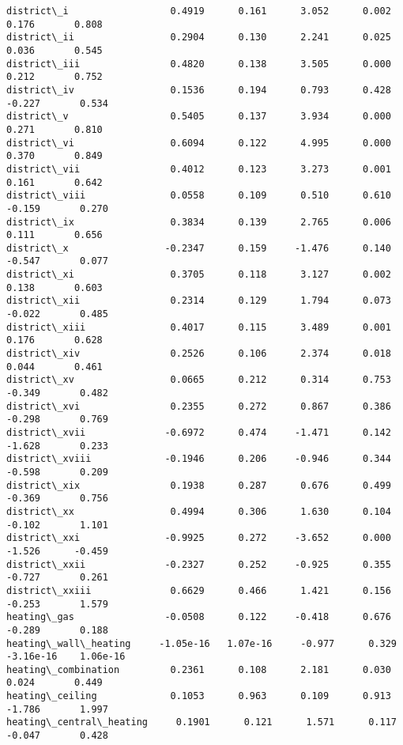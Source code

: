 \documentclass[11pt]{article}
\begin{document}
\begin{Verbatim}[commandchars=\\\{\}]
district\_i                  0.4919      0.161      3.052      0.002       0.176       0.808
district\_ii                 0.2904      0.130      2.241      0.025       0.036       0.545
district\_iii                0.4820      0.138      3.505      0.000       0.212       0.752
district\_iv                 0.1536      0.194      0.793      0.428      -0.227       0.534
district\_v                  0.5405      0.137      3.934      0.000       0.271       0.810
district\_vi                 0.6094      0.122      4.995      0.000       0.370       0.849
district\_vii                0.4012      0.123      3.273      0.001       0.161       0.642
district\_viii               0.0558      0.109      0.510      0.610      -0.159       0.270
district\_ix                 0.3834      0.139      2.765      0.006       0.111       0.656
district\_x                 -0.2347      0.159     -1.476      0.140      -0.547       0.077
district\_xi                 0.3705      0.118      3.127      0.002       0.138       0.603
district\_xii                0.2314      0.129      1.794      0.073      -0.022       0.485
district\_xiii               0.4017      0.115      3.489      0.001       0.176       0.628
district\_xiv                0.2526      0.106      2.374      0.018       0.044       0.461
district\_xv                 0.0665      0.212      0.314      0.753      -0.349       0.482
district\_xvi                0.2355      0.272      0.867      0.386      -0.298       0.769
district\_xvii              -0.6972      0.474     -1.471      0.142      -1.628       0.233
district\_xviii             -0.1946      0.206     -0.946      0.344      -0.598       0.209
district\_xix                0.1938      0.287      0.676      0.499      -0.369       0.756
district\_xx                 0.4994      0.306      1.630      0.104      -0.102       1.101
district\_xxi               -0.9925      0.272     -3.652      0.000      -1.526      -0.459
district\_xxii              -0.2327      0.252     -0.925      0.355      -0.727       0.261
district\_xxiii              0.6629      0.466      1.421      0.156      -0.253       1.579
heating\_gas                -0.0508      0.122     -0.418      0.676      -0.289       0.188
heating\_wall\_heating     -1.05e-16   1.07e-16     -0.977      0.329   -3.16e-16    1.06e-16
heating\_combination         0.2361      0.108      2.181      0.030       0.024       0.449
heating\_ceiling             0.1053      0.963      0.109      0.913      -1.786       1.997
heating\_central\_heating     0.1901      0.121      1.571      0.117      -0.047       0.428

\end{Verbatim}
\end{document}
